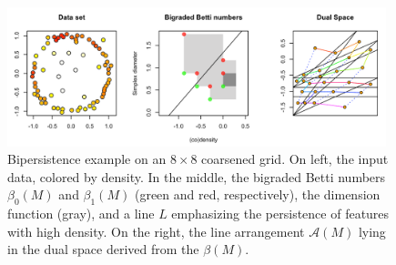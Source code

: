 \documentclass[sn-mathphys]{sn-jnl}
\begin{document}
\begin{figure}[t]
	\includegraphics[width=0.98\textwidth]{bifiltration_ex2}
	\caption{Bipersistence example on an $8 \times 8$ coarsened grid. On left, the input data, colored by density. In the middle, the bigraded Betti numbers $\beta_0(M)$ and $\beta_1(M)$ (green and red, respectively), the dimension function (gray), and a line $L$ emphasizing the persistence of features with high density. On the right, the line arrangement $\mathcal{A}(M)$ lying in the dual space derived from the $\beta(M)$. }
	\label{fig:bifiltration_ex2}
\end{figure}
\\
\end{document}

